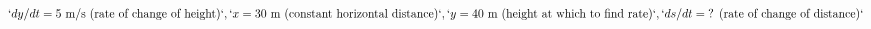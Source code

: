 \documentclass[preview]{standalone}
\begin{document}
\begin{align*}
`dy/dt = 5 \text{ m/s (rate of change of height)}`, `x = 30 \text{ m (constant horizontal distance)}`, `y = 40 \text{ m (height at which to find rate)}`, `ds/dt = \text{? (rate of change of distance)}`
\end{align*}
\end{document}
